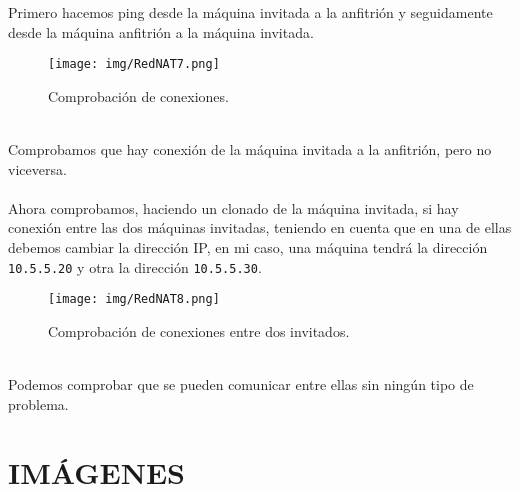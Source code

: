 \documentclass[12pt]{article}
\begin{document}
      \newpage

      Primero hacemos ping desde la máquina invitada a la anfitrión y seguidamente desde la máquina anfitrión a la máquina 
      invitada.
      \begin{figure}[h]
        \centering
        \texttt{[image: img/RedNAT7.png]}
        \caption{Comprobación de conexiones.}
        \label{RedNAT7}
      \end{figure}
      \\
      Comprobamos que hay conexión de la máquina invitada a la anfitrión, pero no viceversa.
      \\\\
      Ahora comprobamos, haciendo un clonado de la máquina invitada, si hay conexión entre las dos máquinas invitadas, teniendo 
      en cuenta que en una de ellas debemos cambiar la dirección IP, en mi caso, una máquina tendrá la dirección \texttt{10.5.5.20} 
      y otra la dirección \texttt{10.5.5.30}.
      \begin{figure}[h]
        \centering
        \texttt{[image: img/RedNAT8.png]}
        \caption{Comprobación de conexiones entre dos invitados.}
        \label{RedNAT8}
      \end{figure}
      \\
      Podemos comprobar que se pueden comunicar entre ellas sin ningún tipo de problema.

      \newpage

    \section{IMÁGENES}
      \listoffigures
\end{document}
